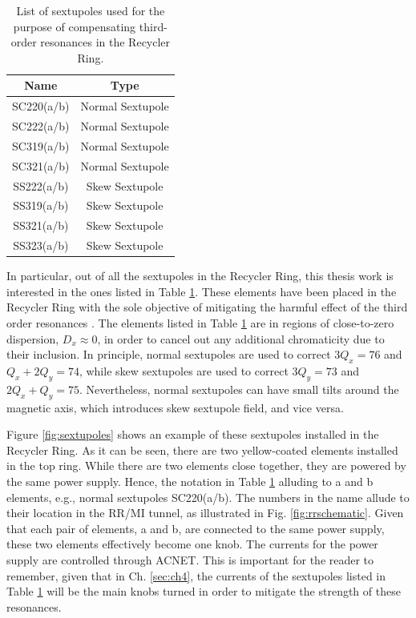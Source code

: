 \begin{table}[H]
   \centering
   \caption{List of sextupoles used for the purpose of compensating third-order resonances in the Recycler Ring.}
   \label{tab:sextscomp}
   \begin{tabular}{|c|c|}
   \hline
   \textbf{Name} & \textbf{Type}    \\ \hline
   SC220(a/b)    & Normal Sextupole \\ \hline
   SC222(a/b)    & Normal Sextupole \\ \hline
   SC319(a/b)    & Normal Sextupole \\ \hline
   SC321(a/b)    & Normal Sextupole \\ \hline
   SS222(a/b)    & Skew Sextupole   \\ \hline
   SS319(a/b)    & Skew Sextupole   \\ \hline
   SS321(a/b)    & Skew Sextupole   \\ \hline
   SS323(a/b)    & Skew Sextupole   \\ \hline
   \end{tabular}
   \end{table}

In particular, out of all the sextupoles in the Recycler Ring, this thesis work is interested in the ones listed in Table \ref{tab:sextscomp}. These elements have been placed in the Recycler Ring with the sole objective of mitigating the harmful effect of the third order resonances \cite{rr2}. The elements listed in Table \ref{tab:sextscomp} are in regions of close-to-zero dispersion, $D_x \approx 0$, in order to cancel out any additional chromaticity due to their inclusion. In principle, normal sextupoles are used to correct $3Q_x=76$ and $Q_x+2Q_y=74$, while skew sextupoles are used to correct $3Q_y=73$ and $2Q_x+Q_y=75$. Nevertheless, normal sextupoles can have small tilts around the magnetic axis, which introduces skew sextupole field, and vice versa.

Figure \ref{fig:sextupoles} shows an example of these sextupoles installed in the Recycler Ring. As it can be seen, there are two yellow-coated elements installed in the top ring. While there are two elements close together, they are powered by the same power supply. Hence, the notation in Table \ref{tab:sextscomp} alluding to a and b elements, e.g., normal sextupoles SC220(a/b). The numbers in the name allude to their location in the RR/MI tunnel, as illustrated in Fig. \ref{fig:rrschematic}. Given that each pair of elements, a and b, are connected to the same power supply, these two elements effectively become one knob. The currents for the power supply are controlled through ACNET. This is important for the reader to remember, given that in Ch. \ref{sec:ch4}, the currents of the sextupoles listed in Table \ref{tab:sextscomp} will be the main knobs turned in order to mitigate the strength of these resonances.    

